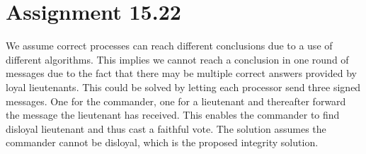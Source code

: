 \section{Assignment 15.22}
We assume correct processes can reach different conclusions due to a use of different algorithms. This implies we cannot reach a conclusion in one round of messages due to the fact that there may be multiple correct answers provided by loyal lieutenants. This could be solved by letting each processor send three signed messages. One for the commander, one for a lieutenant and thereafter forward the message the lieutenant has received. This enables the commander to find disloyal lieutenant and thus cast a faithful vote.
The solution assumes the commander cannot be disloyal, which is the proposed integrity solution.
